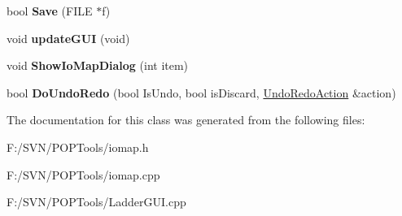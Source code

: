 \begin{DoxyCompactItemize}
\item 
\hypertarget{classmap_i_o_a491316a25f0e25624401aea00fe68011}{bool {\bfseries Save} (F\-I\-L\-E $\ast$f)}\label{classmap_i_o_a491316a25f0e25624401aea00fe68011}

\item 
\hypertarget{classmap_i_o_ac85bc0b469b8a08c5640f5922fe00e23}{void {\bfseries update\-G\-U\-I} (void)}\label{classmap_i_o_ac85bc0b469b8a08c5640f5922fe00e23}

\item 
\hypertarget{classmap_i_o_abc5c5b74d19c81bf7965df0ecdcffde0}{void {\bfseries Show\-Io\-Map\-Dialog} (int item)}\label{classmap_i_o_abc5c5b74d19c81bf7965df0ecdcffde0}

\item 
\hypertarget{classmap_i_o_aa97d7ba10351b66b3b3574827271cc41}{bool {\bfseries Do\-Undo\-Redo} (bool Is\-Undo, bool is\-Discard, \hyperlink{struct_undo_redo_action}{Undo\-Redo\-Action} \&action)}\label{classmap_i_o_aa97d7ba10351b66b3b3574827271cc41}

\end{DoxyCompactItemize}


The documentation for this class was generated from the following files\-:\begin{DoxyCompactItemize}
\item 
F\-:/\-S\-V\-N/\-P\-O\-P\-Tools/iomap.\-h\item 
F\-:/\-S\-V\-N/\-P\-O\-P\-Tools/iomap.\-cpp\item 
F\-:/\-S\-V\-N/\-P\-O\-P\-Tools/Ladder\-G\-U\-I.\-cpp\end{DoxyCompactItemize}
